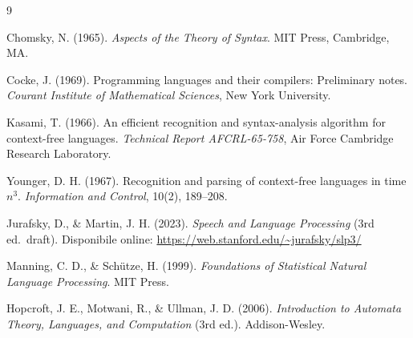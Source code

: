 \documentclass[12pt, a4paper]{article}
\begin{document}
\newpage
\begin{thebibliography}{9}

Chomsky, N. (1965).
\textit{Aspects of the Theory of Syntax}.
MIT Press, Cambridge, MA.

Cocke, J. (1969).
Programming languages and their compilers: Preliminary notes.
\textit{Courant Institute of Mathematical Sciences}, New York University.

Kasami, T. (1966).
An efficient recognition and syntax-analysis algorithm for context-free languages.
\textit{Technical Report AFCRL-65-758}, Air Force Cambridge Research Laboratory.

Younger, D. H. (1967).
Recognition and parsing of context-free languages in time $n^3$.
\textit{Information and Control}, 10(2), 189--208.

Jurafsky, D., \& Martin, J. H. (2023).
\textit{Speech and Language Processing} (3rd ed.\ draft).
Disponibile online: \url{https://web.stanford.edu/~jurafsky/slp3/}

Manning, C. D., \& Schütze, H. (1999).
\textit{Foundations of Statistical Natural Language Processing}.
MIT Press.

Hopcroft, J. E., Motwani, R., \& Ullman, J. D. (2006).
\textit{Introduction to Automata Theory, Languages, and Computation} (3rd ed.).
Addison-Wesley.

\end{thebibliography}
\end{document}
